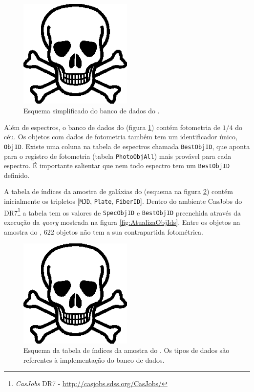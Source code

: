 \begin{figure}
	\includegraphics[width=0.5\textwidth]{figuras/test.eps}
	\caption[Esquema simplificado do banco de dados do \SDSS.]
	{Esquema simplificado do banco de dados do \SDSS.}
	\label{fig:EsquemaSDSS}
\end{figure}

Além de espectros, o banco de dados do \SDSS (figura \ref{fig:EsquemaSDSS})
contém fotometria de $1/4$ do céu. Os objetos com dados de fotometria
também tem um identificador único, {\tt ObjID}. Existe uma coluna na tabela de
espectros chamada {\tt BestObjID}, que aponta para o registro de fotometria
(tabela {\tt PhotoObjAll}) mais provável para cada espectro. É importante
salientar que nem todo espectro tem um {\tt BestObjID} definido.

A tabela de índices da amostra de galáxias do \starlight (esquema na figura
\ref{fig:TabelaAmostraStarlight}) contém inicialmente os tripletos [{\tt MJD},
{\tt Plate}, {\tt FiberID}]. Dentro do ambiente {CasJobs} do \SDSS
DR7\footnote{{\em CasJobs} \SDSS DR7 - \url{http://casjobs.sdss.org/CasJobs/}} a
tabela tem os valores de {\tt SpecObjID} e {\tt BestObjID} preenchida através da
execução da {\em query} mostrada na figura \ref{fig:AtualizaObjIds}. Entre os
objetos na amostra do \starlight, $622$ objetos não tem a sua contrapartida
fotométrica.

\begin{figure}
	\includegraphics[width=0.5\textwidth]{figuras/test.eps}
	\caption[Tabela de índices da amostra do \starlight.]
	{Esquema da tabela de índices da amostra do \starlight. Os tipos de dados são
	referentes à implementação do banco de dados.}
	\label{fig:TabelaAmostraStarlight}
\end{figure}


